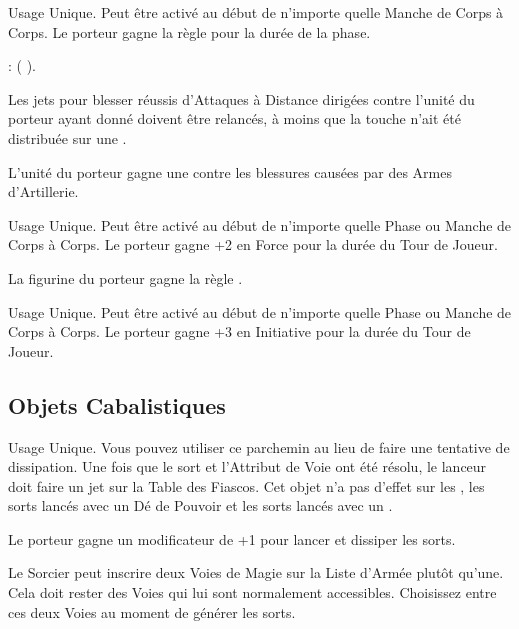 Usage Unique. Peut être activé au début de n'importe quelle Manche de Corps à Corps. Le porteur gagne la règle \stubborn{} pour la durée de la phase.

 : \firesignature{} (\Pathof{} \fire{}).

\columnbreak

Les jets pour blesser réussis d'Attaques à Distance dirigées contre l'unité du porteur ayant donné  doivent être relancés, à moins que la touche n'ait été distribuée sur une \largetarget{}.

L'unité du porteur gagne une  contre les blessures causées par des Armes d'Artillerie.

Usage Unique. Peut être activé au début de n'importe quelle Phase ou Manche de Corps à Corps. Le porteur gagne +2 en Force pour la durée du Tour de Joueur.

La figurine du porteur gagne la règle \divineattacks{}.

Usage Unique. Peut être activé au début de n'importe quelle Phase ou Manche de Corps à Corps. Le porteur gagne +3 en Initiative pour la durée du Tour de Joueur.

\endpricelist

\newpage
\hypertarget{arcaneitems}{\subsection{Objets Cabalistiques}}
\label{arcane_items}

\startpricelist

Usage Unique. Vous pouvez utiliser ce parchemin au lieu de faire une tentative de dissipation. Une fois que le sort et l'Attribut de Voie ont été résolu, le lanceur doit faire un jet sur la Table des Fiascos. Cet objet n'a pas d'effet sur les \boundspells{}, les sorts lancés avec un Dé de Pouvoir et les sorts lancés avec un \overwhelmingpower{}.

Le porteur gagne un modificateur de +1 pour lancer et dissiper les sorts.

Le Sorcier peut inscrire deux Voies de Magie sur la Liste d'Armée plutôt qu'une. Cela doit rester des Voies qui lui sont normalement accessibles. Choisissez entre ces deux Voies au moment de générer les sorts.

